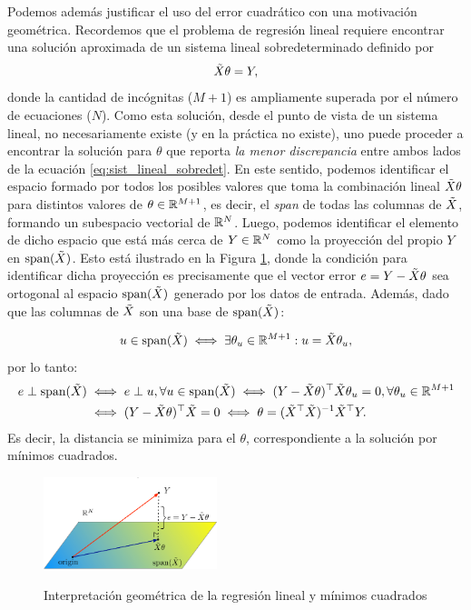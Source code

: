 Podemos además justificar el uso del error cuadrático con una motivación geométrica. Recordemos que el problema de regresión lineal requiere encontrar una solución aproximada de un sistema lineal sobredeterminado definido por 
\begin{equation}
	\tilde{X} \theta = Y,\label{eq:sist_lineal_sobredet}
\end{equation}
donde la cantidad de incógnitas ($M+1$) es ampliamente superada por el número de ecuaciones ($N$). Como esta solución, desde el punto de vista de un sistema lineal, no necesariamente existe (y en la práctica no existe), uno puede proceder a encontrar la solución para $\theta$ que reporta \emph{la menor discrepancia} entre ambos lados de la ecuación \eqref{eq:sist_lineal_sobredet}. En este sentido, podemos identificar el espacio formado por todos los posibles valores que toma la combinación lineal $\tilde{X} \theta$ para distintos valores de $\theta\in\mathbb{R}^{M+1}$, es decir, el \emph{span} de todas las columnas de $\tilde{X}$, formando un subespacio vectorial de $\mathbb{R}^N$. Luego, podemos identificar el elemento de dicho espacio que está más cerca de $Y\in\mathbb{R}^N$  como la proyección del propio $Y$ en $\text{span}(\tilde{X})$. Esto está ilustrado en la Figura \ref{fig:projection}, donde la condición para identificar dicha proyección es  precisamente que el vector error $e=Y-\tilde{X} \theta$ sea ortogonal al espacio  $\text{span}(\tilde{X})$ generado por los datos de entrada. Además, dado que las columnas de $\tilde{X}$ son una base de $\text{span}(\tilde{X})$:

\begin{equation}
	u\in \text{span}(\tilde{X}) \iff \exists \theta_u\in \mathbb{R}^{M+1}: u=\tilde{X}\theta_u,
\end{equation}
por lo tanto:
\begin{align}
	 e\perp \text{span}(\tilde{X}) &\iff e\perp u,\forall u \in \text{span}(\tilde{X}) \iff (Y-\tilde{X} \theta)^\top \tilde{X} \theta_u = 0, \forall \theta_u \in \mathbb{R}^{M+1} \nonumber\\
	& \iff (Y-\tilde{X} \theta)^\top \tilde{X}=0 \iff  \theta = (\tilde{X}^\top\tilde{X})^{-1}\tilde{X}^\top Y.
\end{align}
Es decir, la distancia se minimiza para el $\theta$, correspondiente a la solución por mínimos cuadrados.\\


\begin{figure}[t]
	\centering
	\includegraphics[width=0.45\textwidth]{img/cap2_intuicionLinReg.pdf}\\
	\caption{Interpretación geométrica de la regresión lineal y mínimos cuadrados}
	\label{fig:projection}
\end{figure}



